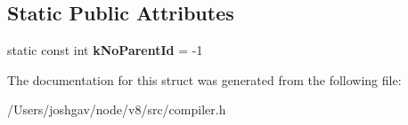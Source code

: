 \subsection*{Static Public Attributes}
\begin{DoxyCompactItemize}
\item 
static const int {\bfseries k\+No\+Parent\+Id} = -\/1\hypertarget{structv8_1_1internal_1_1_inlined_function_info_aa91e693dcdf7682e135dfac612949fc2}{}\label{structv8_1_1internal_1_1_inlined_function_info_aa91e693dcdf7682e135dfac612949fc2}

\end{DoxyCompactItemize}


The documentation for this struct was generated from the following file\+:\begin{DoxyCompactItemize}
\item 
/\+Users/joshgav/node/v8/src/compiler.\+h\end{DoxyCompactItemize}
